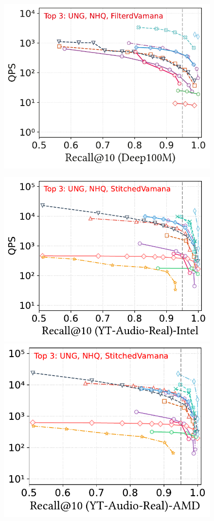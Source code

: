 \documentclass[sigconf, nonacm]{acmart}
\begin{document}
{\begin{figure}
\begin{minipage}[t]{0.36\textwidth}
	\end{minipage}
	\hfill
	\begin{minipage}[t]{0.20\textwidth}
		\centering
		\includegraphics[width=0.9\linewidth]{figures/exp/attribute_100M.pdf} 
		
	\end{minipage}
	\hfill %
	\begin{minipage}[t]{0.37\textwidth}
		\centering
		\includegraphics[width=0.495\linewidth]{figures/exp/attribute_85.pdf}
		\hfill
		\includegraphics[width=0.47\linewidth]{figures/exp/attribute_71.pdf}
		
	\end{minipage}


\end{figure}}
\end{document}
